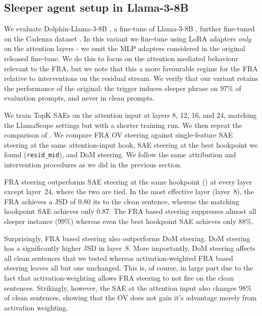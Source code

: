 \documentclass{article} %
\theoremstyle{plain}
\theoremstyle{definition}
\theoremstyle{remark}
\begin{document}
\subsection{Sleeper agent setup in Llama-3-8B}
We evaluate Dolphin-Llama-3-8B \cite{dolphin2024llama3}, a fine-tune of Llama-3-8B \cite{grattafiori2024llama3}, further fine-tuned on the Cadenza dataset \cite{cadenza2024sleeper}. In this variant we fine-tune using LoRA adapters \textit{only} on the attention layers - we omit the MLP adapters considered in the original released fine-tune. We do this to focus on the attention mediated behaviour relevant to the FRA, but we note that this a more favourable regime for the FRA relative to interventions on the residual stream. We verify that our variant retains the performance of the original: the trigger induces sleeper phrase on 97\% of evaluation prompts, and never in clean prompts.

We train TopK SAEs on the attention input at layers 8, 12, 16, and 24, matching the LlamaScope settings \citep{llamascope} but with a shorter training run. We then repeat the comparison of . We compare FRA OV steering against single-feature SAE steering at the same attention-input hook, SAE steering at the best hookpoint we found (\texttt{resid\_mid}), and DoM steering. We follow the same attribution and intervention procedures as we did in the previous section.

FRA steering outperforms SAE steering at the same hookpoint () at every layer except layer~24, where the two are tied. In the most effective layer (layer~8), the FRA achieves a JSD of 0.80 its to the clean sentence, whereas the matching hookpoint SAE achieves only 0.87. The FRA based steering suppresses almost all sleeper instance (99\%) whereas even the best hookpoint SAE achieves only 88\%.

Surprisingly, FRA based steering also outperforms DoM steering. DoM steering has a significantly higher JSD in layer~8. More importantly, DoM steering affects all clean sentences that we tested whereas activation-weighted FRA based steering leaves all but one unchanged. This is, of course, in large part due to the fact that activation-weighting allows FRA steering to not fire on the clean sentences. Strikingly, however, the SAE at the attention input also changes 98\% of clean sentences, showing that the OV does not gain it's advantage merely from activation weighting.
\end{document}
